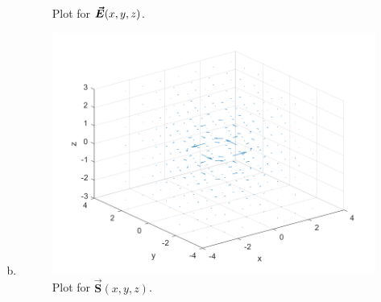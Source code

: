 \documentclass[12pt]{article} %
\begin{document}
\begin{solution}
\begin{enumerate}[(a)]
\begin{figure}[H]
        \caption{Plot for $\boldsymbol{\vec{E}}(x,y,z)$.}
    \end{figure}
    \item 
    \begin{figure}[H]
        \centering
        \includegraphics[width=.6\textwidth]{Figures/vortex.png}
        \caption{Plot for $\boldsymbol{\vec{S}}(x,y,z)$.}
    \end{figure}
\end{enumerate}
\end{solution}
\end{document}
